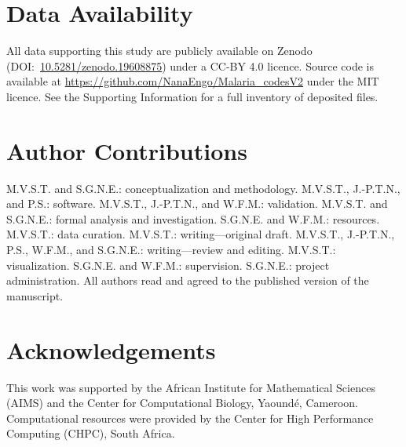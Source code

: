 \documentclass[jcim,article,layout=manuscript]{achemso}
\begin{document}
\section*{Data Availability}
All data supporting this study are publicly available on Zenodo
(DOI:~\href{https://doi.org/10.5281/zenodo.19608875}{10.5281/zenodo.19608875})
under a CC-BY 4.0 licence. Source code is available at
\url{https://github.com/NanaEngo/Malaria_codesV2} under the MIT licence.
See the Supporting Information for a full inventory of deposited files.

\section*{Author Contributions}
M.V.S.T. and S.G.N.E.: conceptualization and methodology. M.V.S.T., J.-P.T.N., and P.S.: software. M.V.S.T., J.-P.T.N., and W.F.M.: validation. M.V.S.T. and S.G.N.E.: formal analysis and investigation. S.G.N.E. and W.F.M.: resources. M.V.S.T.: data curation. M.V.S.T.: writing---original draft. M.V.S.T., J.-P.T.N., P.S., W.F.M., and S.G.N.E.: writing---review and editing. M.V.S.T.: visualization. S.G.N.E. and W.F.M.: supervision. S.G.N.E.: project administration. All authors read and agreed to the published version of the manuscript.

\section*{Acknowledgements}

This work was supported by the African Institute for Mathematical Sciences
(AIMS) and the Center for Computational Biology, Yaound\'{e}, Cameroon.
Computational resources were provided by the Center for High Performance
Computing (CHPC), South Africa.


\end{document}
